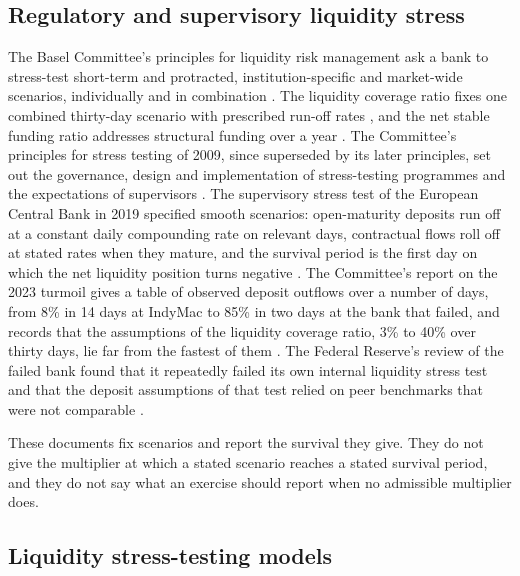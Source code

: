 \subsection{Regulatory and supervisory liquidity stress}

The Basel Committee's principles for liquidity risk management ask a bank to stress-test short-term and protracted, institution-specific and market-wide scenarios, individually and in combination \citep{bcbs144}. The liquidity coverage ratio fixes one combined thirty-day scenario with prescribed run-off rates \citep{bcbs238}, and the net stable funding ratio addresses structural funding over a year \citep{bcbs295}. The Committee's principles for stress testing of 2009, since superseded by its later principles, set out the governance, design and implementation of stress-testing programmes and the expectations of supervisors \citep{bcbs155}. The supervisory stress test of the European Central Bank in 2019 specified smooth scenarios: open-maturity deposits run off at a constant daily compounding rate on relevant days, contractual flows roll off at stated rates when they mature, and the survival period is the first day on which the net liquidity position turns negative \citep{ecblist2019,ecbannex2019}. The Committee's report on the 2023 turmoil gives a table of observed deposit outflows over a number of days, from 8\% in 14 days at IndyMac to 85\% in two days at the bank that failed, and records that the assumptions of the liquidity coverage ratio, 3\% to 40\% over thirty days, lie far from the fastest of them \citep{bcbs555}. The Federal Reserve's review of the failed bank found that it repeatedly failed its own internal liquidity stress test and that the deposit assumptions of that test relied on peer benchmarks that were not comparable \citep{fedsvb2023}.

These documents fix scenarios and report the survival they give. They do not give the multiplier at which a stated scenario reaches a stated survival period, and they do not say what an exercise should report when no admissible multiplier does.

\subsection{Liquidity stress-testing models}

